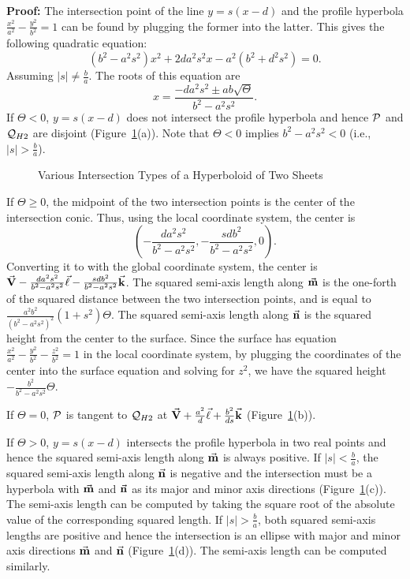{\bf Proof:}  The intersection point of the line $y=s(x-d)$ and the profile
hyperbola $\frac{x^2}{a^2}-\frac{y^2}{b^2}=1$ can be found by plugging the
former into the latter.  This gives the following quadratic equation:
\begin{equation}
\label{eqn:hy2-2degree}
     (b^2-a^2s^2)x^2+2da^2s^2x-a^2(b^2+d^2s^2)=0.
\end{equation}
Assuming $|s|\neq\frac{b}{a}$.  The roots of this equation are
\[ x=\frac{-da^2s^2\pm ab\sqrt{\Theta}}{b^2-a^2s^2}. \]
If $\Theta<0$, $y=s(x-d)$ does not intersect the profile hyperbola and hence
${\cal P}$ and ${\cal Q}_{H2}$ are disjoint (Figure~\ref{fig:hy2}(a)).  
Note that $\Theta<0$ implies $b^2-a^2s^2<0$ (i.e., $|s|>\frac{b}{a}$).
\begin{figure}
\vspace{9.5cm}
\caption{Various Intersection Types of a Hyperboloid of Two Sheets}
\label{fig:hy2}
\end{figure}

     If $\Theta\geq 0$, the midpoint of the two intersection points is the
center of the intersection conic.  Thus, using the local coordinate system, 
the center is 
\[ \left(-\frac{da^2s^2}{b^2-a^2s^2},-\frac{sdb^2}{b^2-a^2s^2},0\right). \]
Converting it to with the global coordinate system, the center is
$\vec{\bf V}-\frac{da^2s^2}{b^2-a^2s^2}\vec{\bf \ell}
-\frac{sdb^2}{b^2-a^2s^2}\vec{\bf k}$.  The squared semi-axis length along 
$\vec{\bf m}$ is the one-forth of the squared distance between the two 
intersection points, and is equal to 
$\frac{a^2b^2}{(b^2-a^2s^2)^2}(1+s^2)\Theta$.  The squared semi-axis length 
along $\vec{\bf n}$ is the squared height from the center to the surface.
Since the surface has equation 
$\frac{x^2}{a^2}-\frac{y^2}{b^2}-\frac{z^2}{b^2}=1$ in the local coordinate
system, by plugging the coordinates of the center into the surface equation and
solving for $z^2$, we have the squared height $-\frac{b^2}{b^2-a^2s^2}\Theta$.

     If $\Theta=0$, ${\cal P}$ is tangent to ${\cal Q}_{H2}$ at
$\vec{\bf V}+\frac{a^2}{d}\vec{\bf \ell}+\frac{b^2}{ds}\vec{\bf k}$
(Figure~\ref{fig:hy2}(b)).

     If $\Theta>0$, $y=s(x-d)$ intersects the profile hyperbola in two real
points and hence the squared semi-axis length along $\vec{\bf m}$ is always 
positive.  If $|s|<\frac{b}{a}$, the squared semi-axis length along $\vec{\bf n}$
is negative and the intersection must be a hyperbola with $\vec{\bf m}$ and
$\vec{\bf n}$ as its major and minor axis directions (Figure~\ref{fig:hy2}(c)).
The semi-axis length can be computed by taking the square root of the absolute
value of the corresponding squared length.  If $|s|>\frac{b}{a}$, both squared
semi-axis lengths are positive and hence the intersection is an ellipse with 
major and minor axis directions $\vec{\bf m}$ and $\vec{\bf n}$ 
(Figure~\ref{fig:hy2}(d)).  The semi-axis length can be computed similarly.

